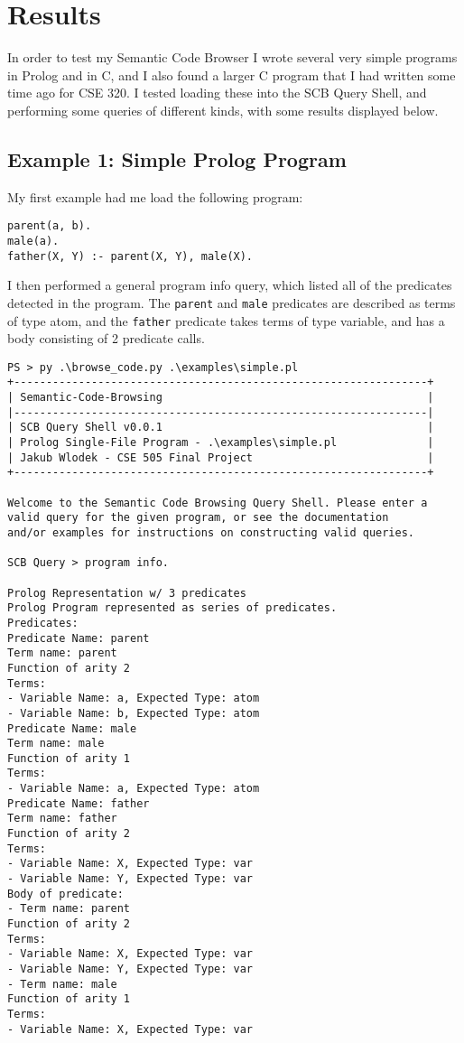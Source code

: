 \documentclass{article}
\begin{document}
\section{Results}

In order to test my Semantic Code Browser I wrote several very simple programs in Prolog and in C, and I also found a larger C program that I had written some time ago for CSE 320. I tested loading these into the SCB Query Shell, and performing some queries of different kinds, with some results displayed below.

\subsection{Example 1: Simple Prolog Program}

My first example had me load the following program:
\begin{Verbatim}[frame=single]
parent(a, b).
male(a).
father(X, Y) :- parent(X, Y), male(X).
\end{Verbatim}

I then performed a general program info query, which listed all of the predicates detected in the program.
The \texttt{parent} and \texttt{male} predicates are described as terms of type atom, and the \texttt{father} predicate takes terms of type variable, and has a body consisting of 2 predicate calls.

\begin{Verbatim}[frame=single]
PS > py .\browse_code.py .\examples\simple.pl
+----------------------------------------------------------------+
| Semantic-Code-Browsing                                         |
|----------------------------------------------------------------|
| SCB Query Shell v0.0.1                                         |
| Prolog Single-File Program - .\examples\simple.pl              |
| Jakub Wlodek - CSE 505 Final Project                           |
+----------------------------------------------------------------+

Welcome to the Semantic Code Browsing Query Shell. Please enter a 
valid query for the given program, or see the documentation 
and/or examples for instructions on constructing valid queries.

SCB Query > program info.

Prolog Representation w/ 3 predicates
Prolog Program represented as series of predicates.
Predicates:
Predicate Name: parent
Term name: parent
Function of arity 2
Terms:
- Variable Name: a, Expected Type: atom
- Variable Name: b, Expected Type: atom
Predicate Name: male
Term name: male
Function of arity 1
Terms:
- Variable Name: a, Expected Type: atom
Predicate Name: father
Term name: father
Function of arity 2
Terms:
- Variable Name: X, Expected Type: var
- Variable Name: Y, Expected Type: var
Body of predicate:
- Term name: parent
Function of arity 2
Terms:
- Variable Name: X, Expected Type: var
- Variable Name: Y, Expected Type: var
- Term name: male
Function of arity 1
Terms:
- Variable Name: X, Expected Type: var
\end{Verbatim}
\end{document}
